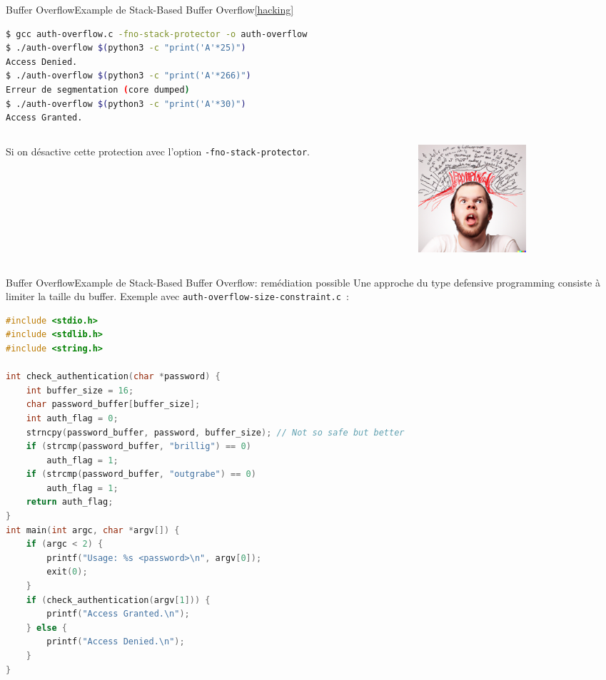 \documentclass{beamer}
\begin{document}
    \begin{frame}[fragile]{Buffer Overflow}{Example de Stack-Based Buffer Overflow\cref{hacking}}
        \begin{lstlisting}[language=bash]
$ gcc auth-overflow.c -fno-stack-protector -o auth-overflow
$ ./auth-overflow $(python3 -c "print('A'*25)")
Access Denied.
$ ./auth-overflow $(python3 -c "print('A'*266)")
Erreur de segmentation (core dumped)
$ ./auth-overflow $(python3 -c "print('A'*30)")
Access Granted.
        \end{lstlisting}
        \bigbreak
        \begin{columns}
            \begin{column}{0.6\textwidth}
                Si on désactive cette protection avec l'option \lstinline{-fno-stack-protector}.
            \end{column}
            \begin{column}{0.4\textwidth}
                \includegraphics[width=4cm]{image/programmer-head-exploding}
            \end{column}
        \end{columns}
    \end{frame}

    \begin{frame}[fragile]{Buffer Overflow}{Example de Stack-Based Buffer Overflow: remédiation possible}
        Une approche du type defensive programming consiste à limiter la taille du buffer.
        Exemple avec \lstinline{auth-overflow-size-constraint.c}~:
        \begin{lstlisting}[language=C,basicstyle=\tiny\ttfamily]
#include <stdio.h>
#include <stdlib.h>
#include <string.h>

int check_authentication(char *password) {
    int buffer_size = 16;
    char password_buffer[buffer_size];
    int auth_flag = 0;
    strncpy(password_buffer, password, buffer_size); // Not so safe but better
    if (strcmp(password_buffer, "brillig") == 0)
        auth_flag = 1;
    if (strcmp(password_buffer, "outgrabe") == 0)
        auth_flag = 1;
    return auth_flag;
}
int main(int argc, char *argv[]) {
    if (argc < 2) {
        printf("Usage: %s <password>\n", argv[0]);
        exit(0);
    }
    if (check_authentication(argv[1])) {
        printf("Access Granted.\n");
    } else {
        printf("Access Denied.\n");
    }
}
        \end{lstlisting}
    \end{frame}
\end{document}
